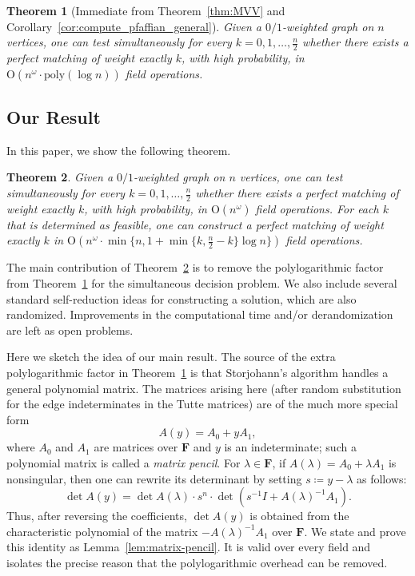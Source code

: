 \documentclass[11pt, a4paper]{article}
\theoremstyle{plain}
\newtheorem{theorem}{Theorem}[section]
\theoremstyle{definition}
\theoremstyle{remark}
\newcommand{\bF}{\mathbf{F}}
\begin{document}
\begin{theorem}[Immediate from Theorem~\ref{thm:MVV} and Corollary~\ref{cor:compute_pfaffian_general}]\label{thm:exact}
Given a $0/1$-weighted graph on $n$ vertices, one can test simultaneously for every $k=0,1,\dots,\frac{n}{2}$ whether there exists a perfect matching of weight exactly $k$, with high probability, in $\mathrm{O}(n^\omega\cdot\mathrm{poly}(\log n))$ field operations.
\end{theorem}



\subsection{Our Result}
In this paper, we show the following theorem.

\begin{theorem}\label{thm:main1}
Given a $0/1$-weighted graph on $n$ vertices, one can test simultaneously for every $k=0,1,\dots,\frac{n}{2}$ whether there exists a perfect matching of weight exactly $k$, with high probability, in $\mathrm{O}(n^\omega)$ field operations.
For each $k$ that is determined as feasible, one can construct a perfect matching of weight exactly $k$ in $\mathrm{O}(n^{\omega}\cdot\min\{n, 1 + \min\{k, \frac{n}{2} - k\} \log n\})$ field operations.
\end{theorem}

The main contribution of Theorem~\ref{thm:main1} is to remove the polylogarithmic factor from Theorem~\ref{thm:exact} for the simultaneous decision problem.
We also include several standard self-reduction ideas for constructing a solution, which are also randomized.
Improvements in the computational time and/or derandomization are left as open problems.

Here we sketch the idea of our main result.
The source of the extra polylogarithmic factor in Theorem~\ref{thm:exact} is that Storjohann's algorithm handles a general polynomial matrix.
The matrices arising here (after random substitution for the edge indeterminates in the Tutte matrices) are of the much more special form
\[A(y)=A_0+yA_1,\]
where $A_0$ and $A_1$ are matrices over $\mathbf{F}$ and $y$ is an indeterminate; such a polynomial matrix is called a \emph{matrix pencil}.
For $\lambda \in \mathbf{F}$, if $A(\lambda)=A_0+\lambda A_1$ is nonsingular, then one can rewrite its determinant by setting $s\coloneqq y-\lambda$ as follows:
\[\det A(y) =\det A(\lambda)\cdot s^n \cdot\det\!\left(s^{-1}I+A(\lambda)^{-1}A_1\right).\]
Thus, after reversing the coefficients, $\det A(y)$ is obtained from the characteristic polynomial of the matrix $-A(\lambda)^{-1}A_1$ over $\bF$.
We state and prove this identity as Lemma~\ref{lem:matrix-pencil}.
It is valid over every field and isolates the precise reason that the polylogarithmic overhead can be removed.
\end{document}
